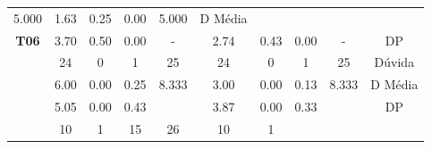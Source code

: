 \begin{table}[htbp]
\begin{tabular}{|cccccccccc}
		\multicolumn{1}{c|}{\cellcolor[HTML]{D9D9D9}5.000} &
		\multicolumn{1}{c|}{\cellcolor[HTML]{D9D9D9}1.63} &
		\multicolumn{1}{c|}{\cellcolor[HTML]{D9D9D9}0.25} &
		\multicolumn{1}{c|}{\cellcolor[HTML]{D9D9D9}0.00} &
		\multicolumn{1}{c|}{\cellcolor[HTML]{D9D9D9}5.000} &
		\multicolumn{1}{c|}{\cellcolor[HTML]{D9D9D9}D Média} \\ \cline{2-10} 
		\multicolumn{1}{|c|}{\multirow{-3}{*}{\cellcolor[HTML]{F2F2F2}\textbf{T06}}} &
		\multicolumn{1}{c|}{3.70} &
		\multicolumn{1}{c|}{0.50} &
		\multicolumn{1}{c|}{0.00} &
		\multicolumn{1}{c|}{-} &
		\multicolumn{1}{c|}{2.74} &
		\multicolumn{1}{c|}{0.43} &
		\multicolumn{1}{c|}{0.00} &
		\multicolumn{1}{c|}{-} &
		\multicolumn{1}{c|}{DP} \\ \hline
		\rowcolor[HTML]{D9D9D9} 
		\multicolumn{1}{|c|}{\cellcolor[HTML]{F2F2F2}} &
		\multicolumn{1}{c|}{\cellcolor[HTML]{D9D9D9}24} &
		\multicolumn{1}{c|}{\cellcolor[HTML]{D9D9D9}0} &
		\multicolumn{1}{c|}{\cellcolor[HTML]{D9D9D9}1} &
		\multicolumn{1}{c|}{\cellcolor[HTML]{D9D9D9}25} &
		\multicolumn{1}{c|}{\cellcolor[HTML]{D9D9D9}24} &
		\multicolumn{1}{c|}{\cellcolor[HTML]{D9D9D9}0} &
		\multicolumn{1}{c|}{\cellcolor[HTML]{D9D9D9}1} &
		\multicolumn{1}{c|}{\cellcolor[HTML]{D9D9D9}25} &
		\multicolumn{1}{c|}{\cellcolor[HTML]{D9D9D9}Dúvida} \\ \cline{2-10} 
		\multicolumn{1}{|c|}{\cellcolor[HTML]{F2F2F2}} &
		\multicolumn{1}{c|}{6.00} &
		\multicolumn{1}{c|}{0.00} &
		\multicolumn{1}{c|}{0.25} &
		\multicolumn{1}{c|}{8.333} &
		\multicolumn{1}{c|}{3.00} &
		\multicolumn{1}{c|}{0.00} &
		\multicolumn{1}{c|}{0.13} &
		\multicolumn{1}{c|}{8.333} &
		\multicolumn{1}{c|}{D Média} \\ \cline{2-10} 
		\rowcolor[HTML]{D9D9D9} 
		\multicolumn{1}{|c|}{\multirow{-3}{*}{\cellcolor[HTML]{F2F2F2}\textbf{T08}}} &
		\multicolumn{1}{c|}{\cellcolor[HTML]{D9D9D9}5.05} &
		\multicolumn{1}{c|}{\cellcolor[HTML]{D9D9D9}0.00} &
		\multicolumn{1}{c|}{\cellcolor[HTML]{D9D9D9}0.43} &
		\multicolumn{1}{c|}{\cellcolor[HTML]{D9D9D9}} &
		\multicolumn{1}{c|}{\cellcolor[HTML]{D9D9D9}3.87} &
		\multicolumn{1}{c|}{\cellcolor[HTML]{D9D9D9}0.00} &
		\multicolumn{1}{c|}{\cellcolor[HTML]{D9D9D9}0.33} &
		\multicolumn{1}{c|}{\cellcolor[HTML]{D9D9D9}} &
		\multicolumn{1}{c|}{\cellcolor[HTML]{D9D9D9}DP} \\ \hline
		\multicolumn{1}{|c|}{\cellcolor[HTML]{F2F2F2}} &
		\multicolumn{1}{c|}{10} &
		\multicolumn{1}{c|}{1} &
		\multicolumn{1}{c|}{15} &
		\multicolumn{1}{c|}{26} &
		\multicolumn{1}{c|}{10} &
		\multicolumn{1}{c|}{1} &

\end{tabular}
\end{table}
